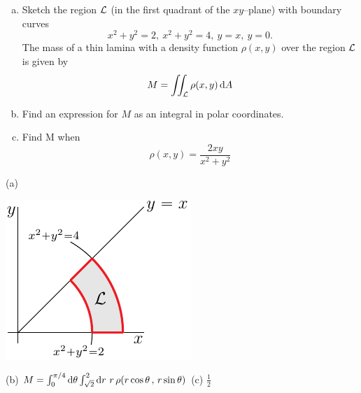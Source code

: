 \begin{question}[M200 2006D] %
\begin{enumerate}[(a)]
\item
Sketch the region $\mathcal{L}$ (in the first quadrant of the $xy$--plane) 
with boundary curves
\begin{equation*}
x^2 + y^2 = 2,\ 
x^2 + y^2 = 4,\ 
y = x,\ 
y = 0.
\end{equation*}
The mass of a thin lamina with a density function $\rho(x,y)$ over 
the region $\mathcal{L}$ is given by
\begin{equation*}
M =\iint_{\mathcal{L}} \rho(x,y)\,\mathrm{d}A
\end{equation*}

\item
Find an expression for $M$ as an integral in polar coordinates.

\item
Find M when
\begin{equation*}
\rho(x,y) = \frac{2xy}{x^2+y^2}
\end{equation*}
\end{enumerate}
\end{question}

%

\begin{answer}
(a)

\begin{center}
     \includegraphics{fig/OE06D_5.pdf}
\end{center}

(b) $M = \int_0^{\pi/4}\mathrm{d}\theta\int_{\sqrt{2}}^2\mathrm{d}r\ r\,
         \rho(r\cos\theta\,,\,r\sin\theta)$ \qquad
(c) $\frac{1}{2}$
\end{answer}


